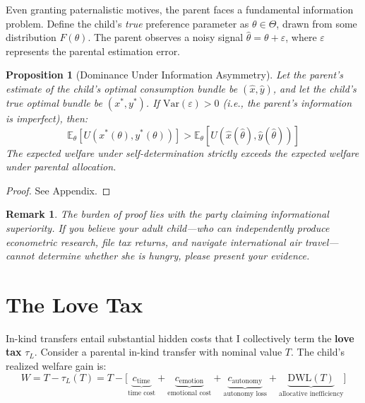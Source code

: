 \documentclass[AER]{AEA}
\newtheorem{proposition}{Proposition}
\newtheorem{remark}{Remark}
\begin{document}
Even granting paternalistic motives, the parent faces a fundamental information problem. Define the child's \textit{true} preference parameter as $\theta \in \Theta$, drawn from some distribution $F(\theta)$. The parent observes a noisy signal $\hat{\theta} = \theta + \varepsilon$, where $\varepsilon$ represents the parental estimation error.

\begin{proposition}[Dominance Under Information Asymmetry]\label{prop:info}
Let the parent's estimate of the child's optimal consumption bundle be $(\hat{x}, \hat{y})$, and let the child's true optimal bundle be $(x^*, y^*)$. If $\text{Var}(\varepsilon) > 0$ (i.e., the parent's information is imperfect), then:
\begin{equation}
\mathbb{E}_\theta[U(x^*(\theta), y^*(\theta))] > \mathbb{E}_\theta[U(\hat{x}(\hat{\theta}), \hat{y}(\hat{\theta}))]
\end{equation}
The expected welfare under self-determination strictly exceeds the expected welfare under parental allocation.
\end{proposition}

\begin{proof}
See Appendix.
\end{proof}

\begin{remark}
The burden of proof lies with the party claiming informational superiority. If you believe your adult child---who can independently produce econometric research, file tax returns, and navigate international air travel---cannot determine whether she is hungry, please present your evidence.
\end{remark}

\section{The Love Tax}\label{sec:tax}

In-kind transfers entail substantial hidden costs that I collectively term the \textbf{love tax} $\tau_L$. Consider a parental in-kind transfer with nominal value $T$. The child's realized welfare gain is:
\begin{equation}\label{eq:lovetax}
W = T - \tau_L(T) = T - \big[\underbrace{c_{\text{time}}}_{\text{time cost}} + \underbrace{c_{\text{emotion}}}_{\text{emotional cost}} + \underbrace{c_{\text{autonomy}}}_{\text{autonomy loss}} + \underbrace{\text{DWL}(T)}_{\text{allocative inefficiency}}\big]
\end{equation}
\end{document}
